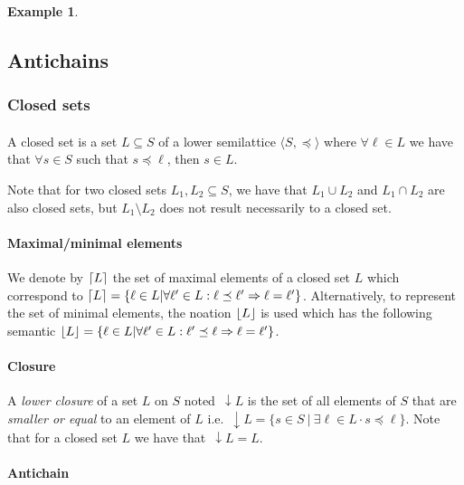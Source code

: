 \documentclass[letterpaper]{article}
\DeclarePairedDelimiter{\ceil}{\lceil}{\rceil}
\DeclarePairedDelimiter{\floor}{\lfloor}{\rfloor}
\newcommand{\darrow}{\, \downarrow \!\!}
\theoremstyle{definition}
\newtheorem{example}{Example}[subsection]
\begin{document}
\begin{example}
\subsection{Antichains}

\subsubsection{Closed sets}

\paragraph{}


A closed set is a set $L \subseteq S$
of a lower semilattice $\langle S, \preceq \rangle$
where $\forall \ell \in L$ we have that $\forall s \in S$ such that
$s \preceq \ell$, then $s \in L$.

Note that for two closed sets $L_1, L_2 \subseteq S$, we have that
$L_1 \cup L_2$ and $L_1 \cap L_2$ are also closed sets,
but $L_1 \setminus L_2$ does not result necessarily to a closed set.

\paragraph{Maximal/minimal elements} We denote by $\ceil{L}$
the set of maximal elements of a closed set $L$ which
correspond to $\ceil{L} =
\{ \ell \in L | \forall \ell' \in L : \ell \preceq \ell'
 \Rightarrow \ell = \ell' \}$. Alternatively, to represent the set of minimal
 elements, the noation $\floor{L}$ is used which has the following semantic
$\floor{L} = \{ \ell \in L | \forall \ell' \in L :  \ell' \preceq \ell
 \Rightarrow \ell = \ell' \}$.


\paragraph{Closure} A \textit{lower closure} of a set $L$ on $S$
noted $\darrow L$ is the set of all elements of $S$ that are
\textit{smaller or equal} to an element of $L$ i.e.
$\darrow L = \{ s \in S \ | \ \exists \ell \in L \cdot s \preceq \ell\}$.
Note that for a closed set $L$ we have that $\darrow L = L$.



\paragraph{Antichain}


\end{example}
\end{document}
